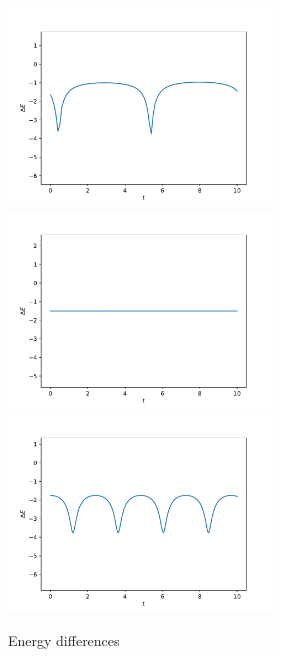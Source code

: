 \documentclass{article}
\begin{document}
\begin{figure}[ht]
    \centering
    \includegraphics[width=7cm]{1e.pdf} 
    \includegraphics[width=7cm]{2e.pdf} 
    \includegraphics[width=7cm]{3e.pdf} 
    \caption{Energy differences}
\end{figure}
\end{document}
